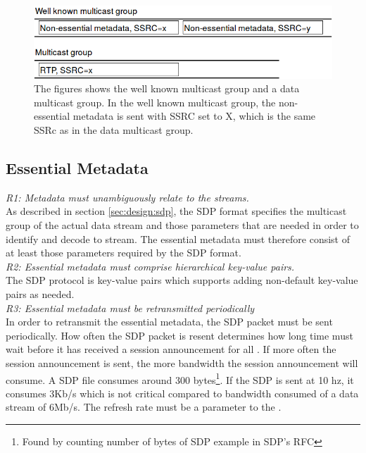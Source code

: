 \begin{figure}[H]
	\centering
	\includegraphics[width=\textwidth]{figures/non-essential-ssrc}
	\caption{The figures shows the well known multicast group and a data multicast group. In the well known multicast group, the non-essential metadata is sent with SSRC set to X, which is the same SSRc as in the data multicast group.}
\end{figure}





\subsection{Essential Metadata} \label{sec:design:essentalmetadata}
\textit{R1: Metadata must unambiguously relate to the streams.}\\
As described in section \ref{sec:design:sdp}, the SDP format specifies the multicast group of the actual data stream and those parameters that are needed in order to identify and decode to stream.
The essential metadata must therefore consist of at least those parameters required by the SDP format.\\

\noindent \textit{R2: Essential metadata must comprise hierarchical key-value pairs.}\\
The SDP protocol is key-value pairs which supports adding non-default key-value pairs as needed. \\

\noindent \textit{R3: Essential metadata must be retransmitted periodically}\\
In order to retransmit the essential metadata, the SDP packet must be sent periodically. How often the SDP packet is resent determines how long time  must wait before it has received a session announcement for all . If more often the session announcement is sent, the more bandwidth the session announcement will consume. A SDP file consumes around 300 bytes\footnote{Found by counting number of bytes of SDP example in SDP's RFC}. If the SDP is sent at 10 hz, it consumes 3Kb/s which is not critical compared to bandwidth consumed of a data stream of 6Mb/s. The refresh rate must be a parameter to the . \\

